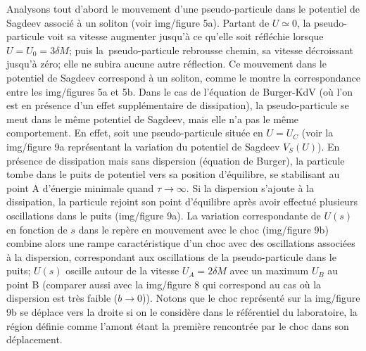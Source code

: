 \documentclass[10pt,thmsa]{article}
\begin{document}
Analysons tout d'abord le mouvement d'une pseudo-particule dans le potentiel
de Sagdeev associ\'{e} \`{a} un soliton (voir img/figure 5a). Partant de
$U\simeq0$, la pseudo-particule voit sa vitesse augmenter jusqu'\`{a} ce
qu'elle soit r\'{e}fl\'{e}chie lorsque $U=U_{0}=3\delta M$; puis
la\ pseudo-particule rebrousse chemin, sa vitesse d\'{e}croissant jusqu'\`{a}
z\'{e}ro; elle ne subira aucune autre r\'{e}flection. Ce mouvement dans le
potentiel de Sagdeev correspond \`{a} un soliton, comme le montre la
correspondance entre les img/figures 5a et 5b. Dans le cas de l'\'{e}quation de
Burger-KdV (o\`{u} l'on est en pr\'{e}sence d'un effet suppl\'{e}mentaire de
dissipation), la pseudo-particule se meut dans le m\^{e}me potentiel de
Sagdeev, mais elle n'a pas le m\^{e}me comportement. En effet, soit une
pseudo-particule situ\'{e}e en $U=U_{C}$ (voir la img/figure 9a repr\'{e}sentant
la variation du potentiel de Sagdeev $V_{S}(U)$). En pr\'{e}sence de
dissipation mais sans dispersion (\'{e}quation de Burger), la particule tombe
dans le puits de potentiel vers sa position d'\'{e}quilibre, se stabilisant au
point A d'\'{e}nergie minimale quand $\tau\rightarrow\infty.$ Si la dispersion
s'ajoute \`{a} la dissipation, la particule rejoint son point d'\'{e}quilibre
apr\`{e}s avoir effectu\'{e} plusieurs oscillations dans le puits (img/figure 9a).
La variation correspondante de $U(s)$ en fonction de $s$ dans le rep\`{e}re en
mouvement avec le choc (img/figure 9b) combine alors une rampe caract\'{e}ristique
d'un choc avec des oscillations associ\'{e}es \`{a} la dispersion,
correspondant aux oscillations de la pseudo-particule dans le puits; $U(s)$
oscille autour de la vitesse $U_{A}=2\delta M$ avec un maximum $U_{B}$ au
point B (comparer aussi avec la img/figure 8 qui correspond au cas o\`{u} la
dispersion est tr\`{e}s faible ($b\rightarrow0$)). Notons que le choc
repr\'{e}sent\'{e} sur la img/figure 9b se d\'{e}place vers la droite si on le
consid\`{e}re dans le r\'{e}f\'{e}rentiel du laboratoire, la r\'{e}gion
d\'{e}finie comme l'amont \'{e}tant la premi\`{e}re rencontr\'{e}e par le choc
dans son d\'{e}placement.
\end{document}
